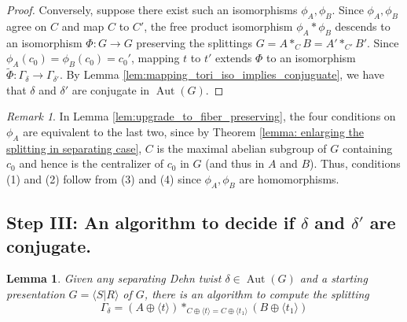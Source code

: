 \documentclass{amsart}
\DeclareMathOperator{\Aut}{Aut}
\theoremstyle{plain}
\newtheorem{lemma}[thm]{Lemma}
\theoremstyle{definition}
\theoremstyle{remark}
\newtheorem{rmk}[thm]{Remark}
\begin{document}
\begin{proof}
     
     
     \vspace{0.2in}
     
    Conversely, suppose there exist such an isomorphisms $\phi_A,\phi_B$. Since $\phi_A, \phi_B$ agree on $C$ and map $C$ to $C'$, the free product isomorphism $\phi_A * \phi_B$ descends to an isomorphism $\Phi : G \to G$ preserving the splittings $G = A *_C B = A' *_{C'} B'$. Since $\phi_A(c_0) = \phi_B(c_0) = c_0'$, mapping $t$ to $t'$ extends $\Phi$ to an isomorphism $\tilde{\Phi} : \Gamma_{\delta} \to \Gamma_{\delta'}$. By Lemma \ref{lem:mapping_tori_iso_implies_conjuguate}, we have that $\delta$ and $\delta'$ are conjugate in $\Aut(G)$.

    
\end{proof}

\begin{rmk}
    \label{remark: simplified conjugacy conditions for separating}
    In Lemma \ref{lem:upgrade_to_fiber_preserving}, the four conditions on $\phi_A$ are equivalent to the last two, since by Theorem \ref{lemma: enlarging the splitting in separating case}, $C$ is the maximal abelian subgroup of $G$ containing $c_0$ and hence is the centralizer of $c_0$ in $G$ (and thus in $A$ and $B$). Thus, conditions (1) and (2) follow from (3) and (4) since $\phi_A, \phi_B$ are homomorphisms.
\end{rmk}



\subsection{Step III: An algorithm to decide if $\delta$ and $\delta'$ are conjugate.}\label{section: algorithm for separating Dehn twists}

\begin{lemma}
\label{lem:Tietze_algo}
    Given any separating Dehn twist $\delta \in \Aut(G)$ and a starting presentation $G = \langle S \vert R \rangle$ of $G$, there is an algorithm to compute the splitting $$\Gamma_{\delta} = (A \oplus \langle t \rangle) *_{C \oplus \langle t \rangle = C \oplus \langle t_1 \rangle} (B \oplus \langle t_1 \rangle)$$
\end{lemma}
\end{document}
